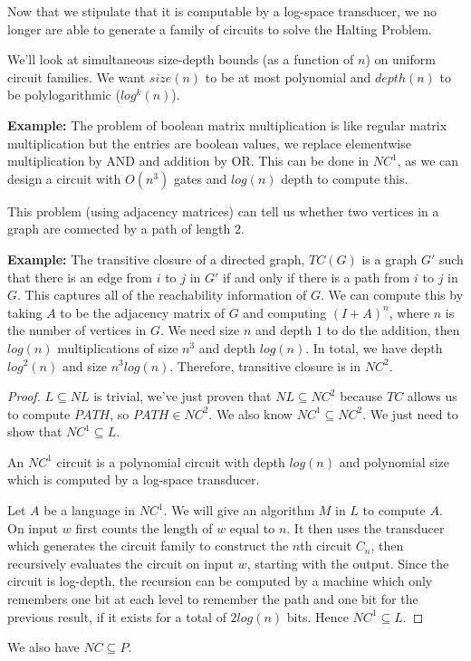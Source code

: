 
Now that we stipulate that it is computable by a log-space transducer, we no longer are able to generate a family of circuits to solve the Halting Problem. 

We'll look at simultaneous size-depth bounds (as a function of $n$) on uniform circuit families.  We want $size(n)$ to be at most polynomial and $depth(n)$ to be polylogarithmic ($log^k(n)$).


\textbf{Example:} The problem of boolean matrix multiplication is like regular matrix multiplication but the entries are boolean values, we replace elementwise multiplication by AND and addition by OR.  This can be done in $NC^1$, as we can design a circuit with $O(n^3)$ gates and $log(n)$ depth to compute this.

This problem (using adjacency matrices) can tell us whether two vertices in a graph are connected by a path of length $2$.

\textbf{Example:} The transitive closure of a directed graph, $TC(G)$ is a graph $G'$ such that there is an edge from $i$ to $j$ in $G'$ if and only if there is a path from $i$ to $j$ in $G$.  This captures all of the reachability information of $G$.  We can compute this by taking $A$ to be the adjacency matrix of $G$ and computing $(I+A)^n$, where $n$ is the number of vertices in $G$.  We need size $n$ and depth $1$ to do the addition, then $log(n)$ multiplications of size $n^3$ and depth $log(n)$.  In total, we have depth $log^2(n)$ and size $n^3log(n)$.  Therefore, transitive closure is in $NC^2$.


\begin{proof}
	$L\subseteq NL$ is trivial, we've just proven that $NL\subseteq NC^2$ because $TC$ allows us to compute $PATH$, so $PATH\in NC^2$.  We also know $NC^1\subseteq NC^2$.  We just need to show that $NC^1\subseteq L$.
	
	An $NC^1$ circuit is a polynomial circuit with depth $log(n)$ and polynomial size which is computed by a log-space transducer.  
	
	Let $A$ be a language in $NC^1$.  We will give an algorithm $M$ in $L$ to compute $A$.  On input $w$ first counts the length of $w$ equal to $n$.  It then uses the transducer which generates the circuit family to construct the $n$th circuit $C_n$, then recursively evaluates the circuit on input $w$, starting with the output.  Since the circuit is log-depth, the recursion can be computed by a machine which only remembers one bit at each level to remember the path and one bit for the previous result, if it exists for a total of $2log(n)$ bits.  Hence $NC^1\subseteq L$.
\end{proof}

We also have $NC\subseteq P$.




